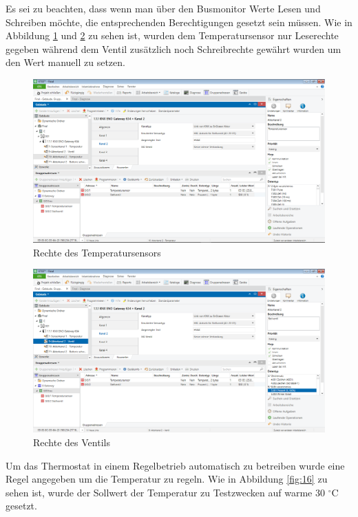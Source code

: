 \documentclass[a4paper]{article}
\begin{document}
Es sei zu beachten, dass wenn man über den Busmonitor Werte Lesen und Schreiben möchte, die entsprechenden Berechtigungen gesetzt sein müssen. Wie in Abbildung \ref{fig:14} und \ref{fig:15} zu sehen ist, wurden dem Temperatursensor nur Leserechte gegeben während dem Ventil zusätzlich noch Schreibrechte gewährt wurden um den Wert manuell zu setzen.

\begin{figure}[H]
	\centering
	\includegraphics[width=13cm]{Doku/14}
	\caption{Rechte des Temperatursensors}
	\label{fig:14}
\end{figure}

\begin{figure}[H]
	\centering
	\includegraphics[width=13cm]{Doku/15}
	\caption{Rechte des Ventils}
	\label{fig:15}
\end{figure}

Um das Thermostat in einem Regelbetrieb automatisch zu betreiben wurde eine Regel angegeben um die Temperatur zu regeln. Wie in Abbildung \ref{fig:16} zu sehen ist, wurde der Sollwert der Temperatur zu Testzwecken auf warme 30 $^{\circ}$C gesetzt.
\end{document}
